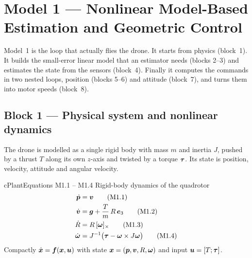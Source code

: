 \section[Model 1 --- Estimation and Geometric Control]{Model 1 --- Nonlinear Model-Based Estimation and Geometric Control}
\label{sec:model1}

Model~1 is the loop that actually flies the drone. It starts from physics (block~1). It builds the
small-error linear model that an estimator needs (blocks 2--3) and estimates the state from the sensors (block~4).
Finally it computes the commands in two nested loops, position (blocks 5--6) and attitude (block~7), and turns them
into motor speeds (block~8).

\subsection{Block 1 --- Physical system and nonlinear dynamics}
\label{sec:m1b1}

The drone is modelled as a single rigid body with mass $m$ and inertia $J$, pushed by a thrust $T$ along its own
$z$-axis and twisted by a torque $\bm{\tau}$. Its state is position, velocity, attitude and angular velocity.

\begin{eqbox}{cPlant}{Equations M1.1 -- M1.4 \quad Rigid-body dynamics of the quadrotor}
\begin{align}
  \dot{\bm{p}} &= \bm{v} \tag{M1.1}\label{eq:m1.1}\\
  \dot{\bm{v}} &= \bm{g} + \frac{T}{m}\,R\,\bm{e}_3 \tag{M1.2}\label{eq:m1.2}\\
  \dot{R}   &= R\,[\bm{\omega}]_{\times} \tag{M1.3}\label{eq:m1.3}\\
  \dot{\bm{\omega}} &= J^{-1}\big(\bm{\tau} - \bm{\omega}\times J\bm{\omega}\big) \tag{M1.4}\label{eq:m1.4}
\end{align}
Compactly $\dot{\bm{x}}=\bm{f}(\bm{x},\bm{u})$ with state $\bm{x}=(\bm{p},\bm{v},R,\bm{\omega})$ and input $\bm{u}=[T;\bm{\tau}]$.
\end{eqbox}

